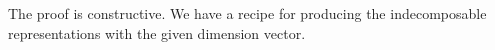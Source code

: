 The proof is constructive. We have a recipe for producing the indecomposable
representations with the given dimension vector.
